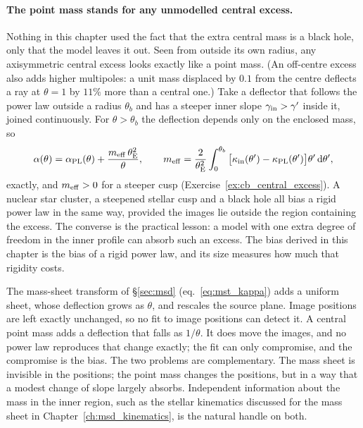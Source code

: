 \paragraph{The point mass stands for any unmodelled central excess.}
Nothing in this chapter used the fact that the extra central mass is a
black hole, only that the model leaves it out. Seen from outside its
own radius, any axisymmetric central excess looks exactly like a point
mass. (An off-centre excess also adds higher multipoles: a unit mass
displaced by $0.1$ from the centre deflects a ray at $\theta=1$ by $11\%$
more than a central one.) 
Take a
deflector that follows the power law outside a radius $\theta_b$ and has
a steeper inner slope $\gamma_{\rm in}>\gamma'$ inside it, joined
continuously. For $\theta>\theta_b$ the deflection depends only on the
enclosed mass, so
\begin{equation}
  \alpha(\theta) = \alpha_{\rm PL}(\theta) + \frac{m_{\rm eff}\,\theta_{\mathrm{E}}^2}{\theta},
  \qquad
  m_{\rm eff} = \frac{2}{\theta_{\mathrm{E}}^2}\int_0^{\theta_b}
  \big[\kappa_{\rm in}(\theta')-\kappa_{\rm PL}(\theta')\big]\theta'\,\dd\theta' ,
  \label{eq:cb_meff}
\end{equation}
exactly, and $m_{\rm eff}>0$ for a steeper cusp
(Exercise~\ref{ex:cb_central_excess}). A nuclear star cluster, a
steepened stellar cusp and a black hole all bias a rigid power law in
the same way, provided the images lie outside the region containing the
excess. The converse is the practical lesson: a model with one extra
degree of freedom in the inner profile can absorb such an excess. The
bias derived in this chapter is the bias of a rigid power law,
and its size measures how much that rigidity costs.

\begin{bridge}
The mass-sheet transform of \S\ref{sec:msd} (eq.~\eqref{eq:mst_kappa})
adds a uniform sheet, whose deflection grows as $\theta$, and rescales
the source plane. Image positions are left exactly unchanged, so
no fit to image positions can detect it. A central point mass adds a
deflection that falls as $1/\theta$. It does move the images,
and no power law reproduces that change exactly; the fit can only
compromise, and the compromise is the bias. The two problems are
complementary. The mass sheet is invisible in the positions; the point
mass changes the positions, but in a way that a modest change of slope
largely absorbs. Independent information about the mass in the inner
region, such as the stellar kinematics discussed for the mass sheet in
Chapter~\ref{ch:msd_kinematics}, is the natural handle on both.
\end{bridge}


